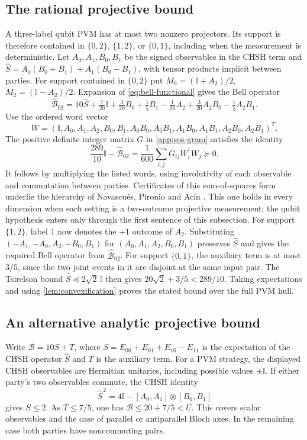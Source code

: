 \documentclass[11pt]{article}
\theoremstyle{definition}
\newcommand{\id}{\mathbb I}
\newcommand{\Bell}{\mathcal B}
\begin{document}
\subsection{The rational projective bound}

A three-label qubit PVM has at most two nonzero projectors. Its support is
therefore contained in \(\{0,2\}\), \(\{1,2\}\), or \(\{0,1\}\), including
when the measurement is deterministic. Let \(A_0,A_1,B_0,B_1\) be the
signed observables in the CHSH term and
\(\widehat S=A_0(B_0+B_1)+A_1(B_0-B_1)\), with tensor products implicit
between parties. For support contained in \(\{0,2\}\) put
\(M_0=(\id+A_2)/2\), \(M_2=(\id-A_2)/2\). Expansion of
\eqref{eq:bell-functional} gives the Bell operator
\[
 \widehat{\Bell}_{02}=10\widehat S+
 \tfrac7{20}\id+\tfrac3{20}B_0+\tfrac15 B_1-\tfrac1{20} A_2
   +\tfrac3{20}A_2 B_0-\tfrac15 A_2 B_1 .
\]
Use the ordered word vector
\[
 W=(\id,A_0,A_1,A_2,B_0,B_1,A_0B_0,A_0B_1,A_1B_0,A_1B_1,A_2B_0,A_2B_1)^T .
\]
The positive definite integer matrix \(G\) in \cref{app:sos-gram}
satisfies the identity
\[
 \frac{289}{10}\id-\widehat{\Bell}_{02}
   =\frac1{600}\sum_{i,j}G_{ij}W_i^\dagger W_j\succeq0 .
\]
It follows by multiplying the listed words, using involutivity of each
observable and commutation between parties. Certificates of this
sum-of-squares form underlie the hierarchy of Navascu\'es, Pironio and
Ac\'in \cite{navascues2007,navascues2008}. This one holds in every
dimension when each setting is a two-outcome projective measurement; the
qubit hypothesis enters only through the first sentence of this subsection.
For support \(\{1,2\}\), label
1 now denotes the \(+1\) outcome of \(A_2\). Substituting
\((-A_1,-A_0,A_2,-B_0,B_1)\) for
\((A_0,A_1,A_2,B_0,B_1)\) preserves \(\widehat S\) and gives the required
Bell operator from \(\widehat{\Bell}_{02}\).
For support \(\{0,1\}\), the auxiliary term is at most \(3/5\), since
the two joint events in it are disjoint at the same input pair.
The Tsirelson bound \(\widehat S\preceq2\sqrt2\,\id\) \cite{tsirelson1980}
then gives \(20\sqrt2+3/5<289/10\).
Taking expectations and using \cref{lem:convexification} proves the stated
bound over the full PVM hull.

\subsection{An alternative analytic projective bound}

Write \(\Bell=10S+T\), where \(S=E_{00}+E_{01}+E_{10}-E_{11}\) is the
expectation of the CHSH operator \(\widehat S\) and \(T\) is the auxiliary
term. For a PVM strategy, the displayed CHSH observables are
Hermitian unitaries, including possible values \(\pm\id\). If either
party's two observables commute, the CHSH identity
\[
\widehat S^{\,2}
=4\id-[A_0,A_1]\otimes[B_0,B_1]
\]
gives \(S\le2\). As \(T\le7/5\), one has \(\Bell\le20+7/5<U\).
This covers scalar observables and the case of parallel or antiparallel
Bloch axes. In the remaining case both parties have noncommuting pairs.
\end{document}
